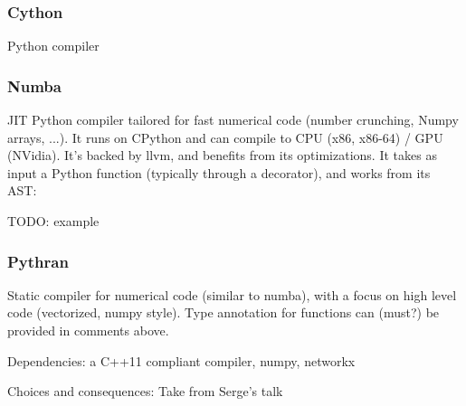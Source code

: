\subsubsection{Cython}

Python compiler

\subsubsection{Numba}

JIT Python compiler tailored for fast numerical code (number crunching, Numpy arrays, ...).
It runs on CPython and can compile to CPU (x86, x86-64) / GPU (NVidia). It's backed by llvm, and benefits from its optimizations. It takes as input a Python function (typically through a decorator), and works from its AST:

TODO: example

\subsubsection{Pythran}

Static compiler for numerical code (similar to numba), with a focus on high level code (vectorized, numpy style).
Type annotation for functions can (must?) be provided in comments above.

Dependencies: a C++11 compliant compiler, numpy, networkx

Choices and consequences: Take from Serge's talk
